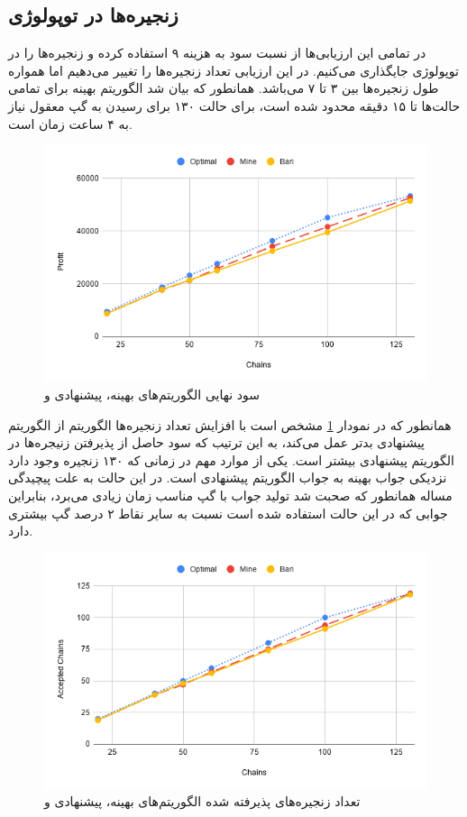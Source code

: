 \subsection{زنجیره‌ها در توپولوژی }

در تمامی این ارزیابی‌ها از نسبت سود به هزینه ۹ استفاده کرده و زنجیره‌ها را در توپولوژی  جایگذاری می‌کنیم.
در این ارزیابی تعداد زنجیره‌ها را تغییر می‌دهیم اما همواره طول زنجیره‌ها بین ۳ تا ۷ می‌باشد.
همانطور که بیان شد الگوریتم بهینه برای تمامی حالت‌ها تا ۱۵ دقیقه محدود شده است، برای حالت ۱۳۰ برای رسیدن به گپ معقول نیاز به ۴ ساعت زمان است.


\begin{figure}[h]
\center\includegraphics[scale=.5]{images/chart-2}
\caption{سود نهایی الگوریتم‌های بهینه، پیشنهادی و \cite{Bari2015}}
\label{fig.7}
\end{figure}

همانطور که در نمودار \ref{fig.7} مشخص است با افزایش تعداد زنجیره‌ها الگوریتم \cite{Bari2015} از الگوریتم پیشنهادی بدتر عمل می‌کند،
به این ترتیب که سود حاصل از پذیرفتن زنیجره‌ها در الگوریتم پیشنهادی بیشتر است.
یکی از موارد مهم در زمانی که ۱۳۰ زنجیره وجود دارد نزدیکی جواب بهینه به جواب الگوریتم پیشنهادی است.
در این حالت به علت پیچیدگی مساله همانطور که صحبت شد تولید جواب با گپ مناسب زمان زیادی می‌برد،
بنابراین جوابی که در این حالت استفاده شده است نسبت به سایر نقاط ۲ درصد گپ بیشتری دارد.


\begin{figure}[h]
\center\includegraphics[scale=.5]{images/chart-3}
\caption{تعداد زنجیره‌های پذیرفته شده الگوریتم‌های بهینه، پیشنهادی و \cite{Bari2015}}
\label{fig.8}
\end{figure}

